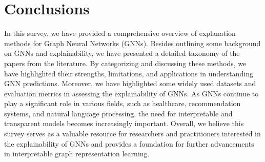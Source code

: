 \section{Conclusions}
\label{sec:conclusion}
In this survey, we have provided a comprehensive overview of explanation methods for Graph Neural Networks (GNNs). Besides outlining some background on GNNs and explainability, we have presented a detailed taxonomy of the papers from the literature. By categorizing and discussing these methods, we have highlighted their strengths, limitations, and applications in understanding GNN predictions. Moreover, we have highlighted some widely used datasets and evaluation metrics in assessing the explainability of GNNs. As GNNs continue to play a significant role in various fields, such as healthcare, recommendation systems, and natural language processing, the need for interpretable and transparent models becomes increasingly important. Overall, we believe this survey serves as a valuable resource for researchers and practitioners interested in the explainability of GNNs and provides a foundation for further advancements in interpretable graph representation learning. %


 


